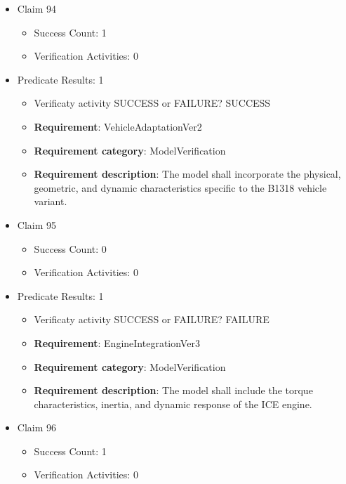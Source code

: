 \documentclass{article}
\begin{document}
\begin{itemize}
  				  \item Claim 94
				\begin{itemize}
			    	\item Success Count: 1 
			    	\item Verification Activities: 0
				\end{itemize}
				
									    
				\item Predicate Results: 1
					\begin{itemize}				
					\item Verificaty activity SUCCESS or FAILURE? SUCCESS
					
					\item \textbf{Requirement}: VehicleAdaptationVer2 
					\item \textbf{Requirement category}: ModelVerification
					\item \textbf{Requirement description}: The model shall incorporate the physical, geometric, and dynamic characteristics specific to the B1318 vehicle variant.
					\end{itemize}

  				  \item Claim 95
				\begin{itemize}
			    	\item Success Count: 0 
			    	\item Verification Activities: 0
				\end{itemize}
				
									    
				\item Predicate Results: 1
					\begin{itemize}				
					\item Verificaty activity SUCCESS or FAILURE? FAILURE
					
					\item \textbf{Requirement}: EngineIntegrationVer3 
					\item \textbf{Requirement category}: ModelVerification
					\item \textbf{Requirement description}: The model shall include the torque characteristics, inertia, and dynamic response of the ICE engine.
					\end{itemize}

  				  \item Claim 96
				\begin{itemize}
			    	\item Success Count: 1 
			    	\item Verification Activities: 0
				\end{itemize}
				

\end{itemize}
\end{document}
